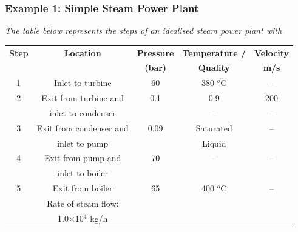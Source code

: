 \documentclass[10pt,compress,handout,ignorenonframetext]{beamer}
\begin{document}
\begin{frame}
 \frametitle{Example 1: Simple Steam Power Plant}
    {\it The table below represents the steps of an idealised steam power plant with
    \begin{center}
     \begin{tabular}{||c | c | c | c | c ||}
      \hline\hline
       {\bf Step} & {\bf Location}       & {\bf Pressure}  & {\bf Temperature /}   & {\bf Velocity} \\
                  &                      & {\bf (bar)}     & {\bf Quality}         & {\bf m/s}      \\
      \hline\hline
          1       & Inlet to turbine     &   60            &   380 $^{o}$C          &   --           \\
      \hline
          2       & Exit from turbine and&   0.1           &   0.9                 & 200             \\
                  & inlet to condenser   &                 &    --                 &     --          \\ 
      \hline
          3       & Exit from condenser and&  0.09         &  Saturated            &   --            \\
                  & inlet to pump        &                 &  Liquid               &                 \\
      \hline
          4       & Exit from pump and   &  70             &   --                  &     --          \\
                  & inlet to boiler      &                 &                       &                 \\
      \hline 
          5       & Exit from boiler     &  65             &  400 $^{o}$C           &      --        \\
                  & Rate of steam flow:   &                 &                       &                 \\
                  & 1.0$\times$10$^{4}$ kg/h &             &                       &                 \\
     
      \hline\hline
     \end{tabular}
    \end{center}}
 \normalsize
\end{frame}
\end{document}
